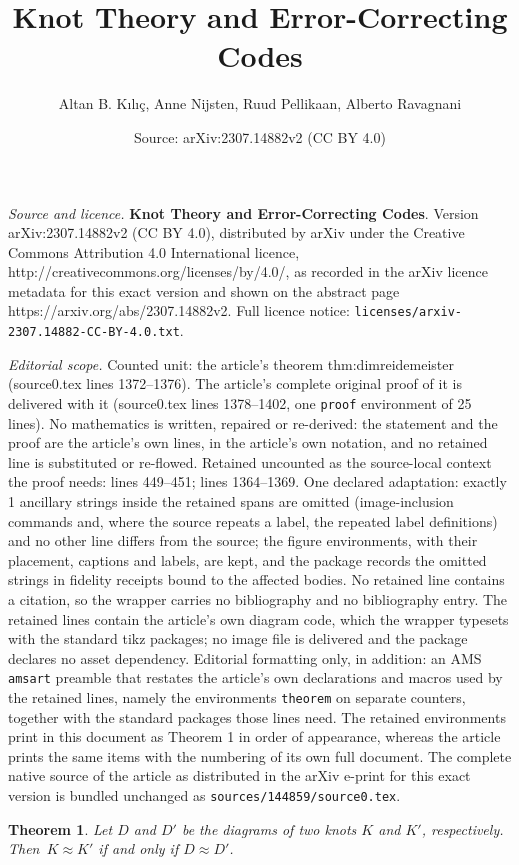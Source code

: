 \documentclass[10pt,a4paper]{amsart}
\title{\textbf{Knot Theory and Error-Correcting Codes}}
\author{Altan B. K\i l\i\c{c}, Anne Nijsten, Ruud Pellikaan, Alberto Ravagnani}
\date{Source: arXiv:2307.14882v2 (CC BY 4.0)}
\newtheorem{theorem}{Theorem}
\begin{document}
\maketitle

\noindent\emph{Source and licence.} \textbf{Knot Theory and Error-Correcting Codes}. Version arXiv:2307.14882v2 (CC BY 4.0), distributed by arXiv under the Creative Commons Attribution 4.0 International licence, http://creativecommons.org/licenses/by/4.0/, as recorded in the arXiv licence metadata for this exact version and shown on the abstract page https://arxiv.org/abs/2307.14882v2. Full licence notice: \texttt{licenses/arxiv-2307.14882-CC-BY-4.0.txt}.\par\smallskip

\noindent\textit{Editorial scope.} Counted unit: the article's theorem thm:dimreidemeister (source0.tex lines 1372--1376). The article's complete original proof of it is delivered with it (source0.tex lines 1378--1402, one \texttt{proof} environment of 25 lines). No mathematics is written, repaired or re-derived: the statement and the proof are the article's own lines, in the article's own notation, and no retained line is substituted or re-flowed.  Retained uncounted as the source-local context the proof needs: lines 449--451; lines 1364--1369.  One declared adaptation: exactly 1 ancillary strings inside the retained spans are omitted (image-inclusion commands and, where the source repeats a label, the repeated label definitions) and no other line differs from the source; the figure environments, with their placement, captions and labels, are kept, and the package records the omitted strings in fidelity receipts bound to the affected bodies.  No retained line contains a citation, so the wrapper carries no bibliography and no bibliography entry.  The retained lines contain the article's own diagram code, which the wrapper typesets with the standard tikz packages; no image file is delivered and the package declares no asset dependency.  Editorial formatting only, in addition: an AMS \texttt{amsart} preamble that restates the article's own declarations and macros used by the retained lines, namely the environments \texttt{theorem} on separate counters, together with the standard packages those lines need.  The retained environments print in this document as Theorem 1 in order of appearance, whereas the article prints the same items with the numbering of its own full document.  The complete native source of the article as distributed in the arXiv e-print for this exact version is bundled unchanged as \texttt{sources/144859/source0.tex}.
\begin{theorem}\label{thm:reidemeistermoves}
Let $D$ and $D'$ be the diagrams of two knots $K$ and $K'$, respectively. Then~$K \approx K'$ if and only if $D \approx D'$.
\end{theorem}
\end{document}
